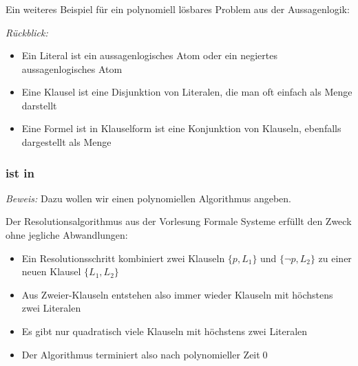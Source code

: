 \documentclass[onlymath]{beamer}
\begin{document}
\begin{frame}\frametitle{}

Ein weiteres Beispiel für ein polynomiell lösbares Problem aus der Aussagenlogik:
\bigskip

\emph{Rückblick:}
\begin{itemize}
\item Ein \alert{Literal} ist ein aussagenlogisches Atom oder ein negiertes aussagenlogisches Atom
\item Eine \alert{Klausel} ist eine Disjunktion von Literalen, die man oft einfach als Menge darstellt
\item Eine Formel ist in \alert{Klauselform} ist eine Konjunktion von Klauseln,
ebenfalls dargestellt als Menge
\end{itemize}\pause


\end{frame}

\begin{frame}\frametitle{ ist in }


\pause\emph{Beweis:} Dazu wollen wir einen polynomiellen Algorithmus angeben.
\pause\bigskip

Der Resolutionsalgorithmus aus der Vorlesung Formale Systeme erfüllt den Zweck ohne jegliche Abwandlungen:
\begin{itemize}
\item Ein Resolutionsschritt kombiniert zwei Klauseln $\{p,L_1\}$ und $\{\neg p,L_2\}$
zu einer neuen Klausel $\{L_1,L_2\}$
\item Aus Zweier-Klauseln entstehen also immer wieder Klauseln mit höchstens zwei Literalen
\item Es gibt nur quadratisch viele Klauseln mit höchstens zwei Literalen
\item Der Algorithmus terminiert also nach polynomieller Zeit\qed
\end{itemize}

\end{frame}

\end{document}
